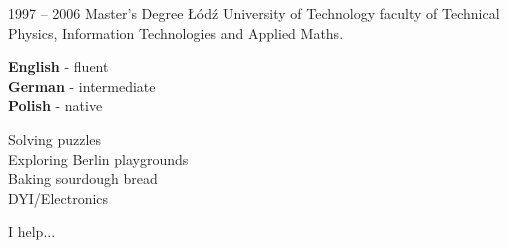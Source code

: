 \documentclass[8pt]{developercv} %
\begin{document}

\begin{entrylist}
	\entry
		{1997 -- 2006}
		{Master's Degree}
		{Łódź University of Technology}
		{faculty of Technical Physics, Information Technologies and Applied Maths.}
\end{entrylist}


\begin{minipage}[t]{0.3\textwidth}
	\vspace{-\baselineskip} %

	
	\textbf{English} - fluent\\
	\textbf{German} - intermediate\\
	\textbf{Polish} - native
\end{minipage}
\hfill
\begin{minipage}[t]{0.3\textwidth}
	\vspace{-\baselineskip} %
	
	
	Solving puzzles\\
	Exploring Berlin playgrounds\\
	Baking sourdough bread\\
	DYI/Electronics
\end{minipage}
\hfill
\begin{minipage}[t]{0.3\textwidth}
	\vspace{-\baselineskip} %
	
	
	I help... \lorem
\end{minipage}

\end{document}
